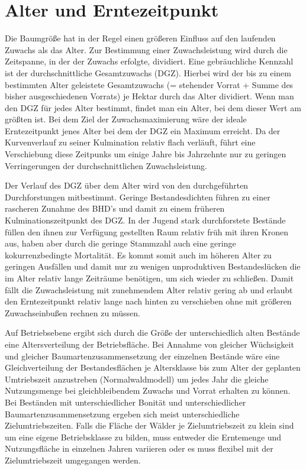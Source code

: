 \documentclass[twocolumn]{scrartcl}
\begin{document}
\section{Alter und Erntezeitpunkt}
\label{sec:AlterUndErntezeitpunkt}

Die Baumgröße hat in der Regel einen größeren Einfluss auf den laufenden Zuwachs
als das Alter. Zur Bestimmung einer Zuwachsleistung wird durch die Zeitspanne,
in der der Zuwachs erfolgte, dividiert. Eine gebräuchliche Kennzahl ist der
durchschnittliche Gesamtzuwachs (DGZ). Hierbei wird der bis zu einem bestimmten
Alter geleistete Gesamtzuwachs (= stehender Vorrat + Summe des bisher
ausgeschiedenen Vorrats) je Hektar durch das Alter dividiert. Wenn man den DGZ
für jedes Alter bestimmt, findet man ein Alter, bei dem dieser Wert am größten
ist. Bei dem Ziel der Zuwachsmaximierung wäre der ideale Erntezeitpunkt jenes
Alter bei dem der DGZ ein Maximum erreicht. Da der Kurvenverlauf zu seiner
Kulmination relativ flach verläuft, führt eine Verschiebung diese Zeitpunks um
einige Jahre bis Jahrzehnte nur zu geringen Verringerungen der
durchschnittlichen Zuwachsleistung.

Der Verlauf des DGZ über dem Alter wird von den durchgeführten Durchforstungen
mitbestimmt. Geringe Bestandesdichten führen zu einer rascheren Zunahme des
BHD's und damit zu einem früheren Kulminationszeitpunkt des DGZ. In der Jugend
stark durchforstete Bestände füllen den ihnen zur Verfügung gestellten Raum
relativ früh mit ihren Kronen aus, haben aber durch die geringe Stammzahl auch
eine geringe kokurrenzbedingte Mortalität. Es kommt somit auch im höheren Alter
zu geringen Ausfällen und damit nur zu wenigen unproduktiven Bestandeslücken die
im Alter relativ lange Zeiträume benötigen, um sich wieder zu schließen. Damit
fällt die Zuwachsleistung mit zunehmendem Alter relativ gering ab und erlaubt
den Erntezeitpunkt relativ lange nach hinten zu verschieben ohne mit größeren
Zuwachseinbußen rechnen zu müssen.

Auf Betriebsebene ergibt sich durch die Größe der unterschiedlich alten Bestände
eine Altersverteilung der Betriebsfläche. Bei Annahme von gleicher Wüchsigkeit
und gleicher Baumartenzusammensetzung der einzelnen Bestände wäre eine
Gleichverteilung der Bestandesflächen je Altersklasse bis zum Alter der
geplanten Umtriebszeit anzustreben (Normalwaldmodell) um jedes Jahr die gleiche
Nutzungsmenge bei gleichbleibendem Zuwachs und Vorrat erhalten zu können. Bei
Beständen mit unterschiedlicher Bonität und unterschiedlicher
Baumartenzusammensetzung ergeben sich meist unterschiedliche Zielumtriebszeiten.
Falls die Fläche der Wälder je Zielumtriebszeit zu klein sind um eine eigene
Betriebsklasse zu bilden, muss entweder die Erntemenge und Nutzungsfläche in
einzelnen Jahren variieren oder es muss flexibel mit der Zielumtriebszeit
umgegangen werden.
\end{document}
